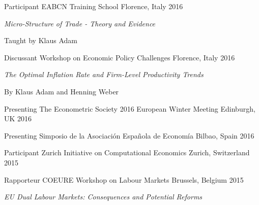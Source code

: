 

\begin{cventries}

\cventry
    {Participant} %
    {EABCN Training School} %
    {Florence, Italy} %
    {2016} %
    {
        \begin{cvitems} %
            \item {\textit{Micro-Structure of Trade - Theory and Evidence}}
            \item {Taught by Klaus Adam}
        \end{cvitems}
    }

\cventry
    {Discussant} %
    {Workshop on Economic Policy Challenges} %
    {Florence, Italy} %
    {2016} %
    {
        \begin{cvitems} %
            \item {\textit{The Optimal Inflation Rate and Firm-Level Productivity Trends}}
            \item {By Klaus Adam and Henning Weber}
        \end{cvitems}
    }

\cventry
    {Presenting} %
    {The Econometric Society 2016 European Winter Meeting} %
    {Edinburgh, UK} %
    {2016} %
    {}

\cventry
    {Presenting} %
    {Simposio de la Asociación Española de Economía} %
    {Bilbao, Spain} %
    {2016} %
    {}

\cventry
    {Participant} %
    {Zurich Initiative on Computational Economics} %
    {Zurich, Switzerland} %
    {2015} %
    {}

\cventry
    {Rapporteur} %
    {COEURE Workshop on Labour Markets} %
    {Brussels, Belgium} %
    {2015} %
    {
      \begin{cvitems} %
        \item {\textit{EU Dual Labour Markets: Consequences and Potential Reforms}}
      \end{cvitems}
    }

\end{cventries}
